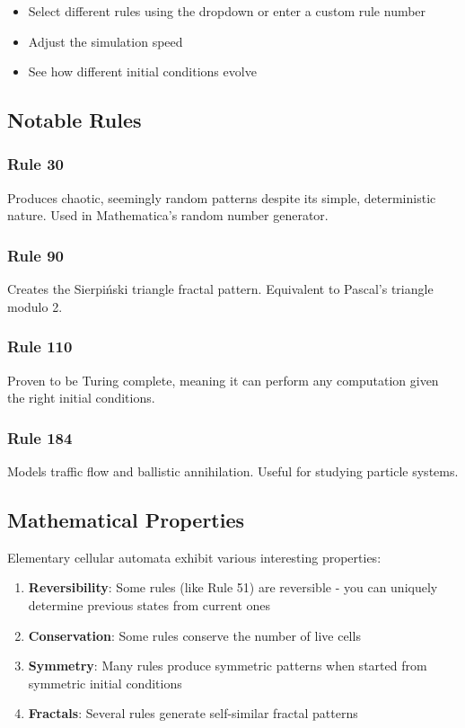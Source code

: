 \documentclass{article}
\begin{document}
\begin{itemize}
\item Select different rules using the dropdown or enter a custom rule number
\item Adjust the simulation speed
\item See how different initial conditions evolve
\end{itemize}


\subsection{Notable Rules}

\subsubsection{Rule 30}
Produces chaotic, seemingly random patterns despite its simple, deterministic nature. Used in Mathematica's random number generator.

\subsubsection{Rule 90}
Creates the Sierpiński triangle fractal pattern. Equivalent to Pascal's triangle modulo 2.

\subsubsection{Rule 110}
Proven to be Turing complete, meaning it can perform any computation given the right initial conditions.

\subsubsection{Rule 184}
Models traffic flow and ballistic annihilation. Useful for studying particle systems.

\subsection{Mathematical Properties}

Elementary cellular automata exhibit various interesting properties:

\begin{enumerate}
\item \textbf{Reversibility}: Some rules (like Rule 51) are reversible - you can uniquely determine previous states from current ones
\item \textbf{Conservation}: Some rules conserve the number of live cells
\item \textbf{Symmetry}: Many rules produce symmetric patterns when started from symmetric initial conditions
\item \textbf{Fractals}: Several rules generate self-similar fractal patterns
\end{enumerate}
\end{document}
